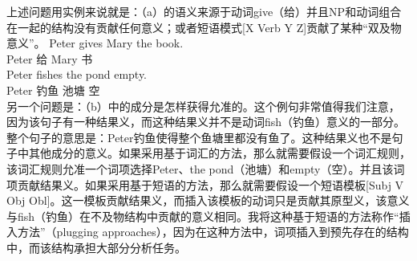 上述问题用实例来说就是：（a）的语义来源于动词give（给）并且NP和动词组合在一起的结构没有贡献任何意义；或者短语模式[X Verb Y Z]贡献了某种“双及物意义”。
\eal
\ex 
\gll Peter gives Mary the book.\\
      Peter 给 Mary  书\\
\ex 
\gll Peter fishes the pond empty.\\
Peter 钓鱼  池塘 空\\
\zl
另一个问题是：（b）中的成分是怎样获得允准的。这个例句非常值得我们注意，因为该句子有一种结果义，而这种结果义并不是动词fish（钓鱼）意义的一部分。整个句子的意思是：Peter钓鱼使得整个鱼塘里都没有鱼了。这种结果义也不是句子中其他成分的意义。如果采用基于词汇的方法，那么就需要假设一个词汇规则，该词汇规则允准一个词项选择Peter、the pond（池塘）和empty（空）。并且该词项贡献结果义。如果采用基于短语的方法，那么就需要假设一个短语模板[Subj V Obj Obl]。这一模板贡献结果义，而插入该模板的动词只是贡献其原型义，该意义与fish（钓鱼）在不及物结构中贡献的意义相同。我将这种基于短语的方法称作“插入方法”（plugging approaches），因为在这种方法中，词项插入到预先存在的结构中，而该结构承担大部分分析任务。
